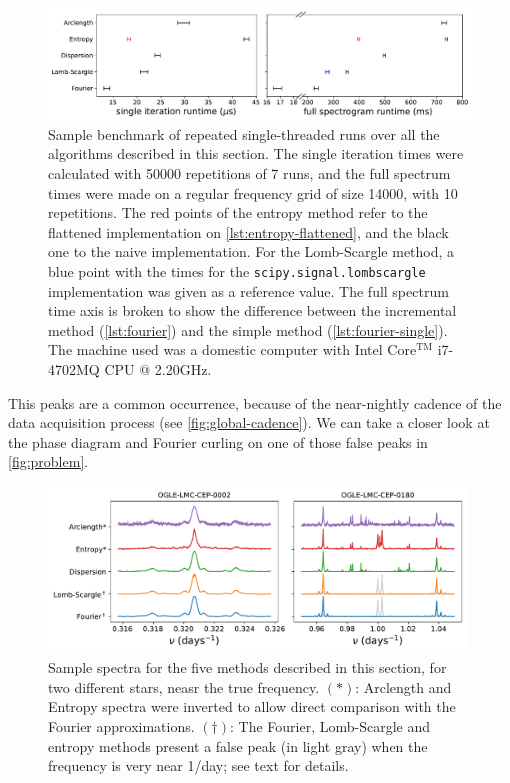 \begin{figure}
	\centering
	\includegraphics[width=\textwidth]{img/runtimes.pdf}
	\caption[Illustrative benchmark for the algorithms]{
		Sample benchmark of repeated single-threaded runs over all the algorithms described in this section.
		The single iteration times were calculated with 50000 repetitions of 7 runs, 
		and the full spectrum times were made on a regular frequency grid of size 14000, with 10 repetitions.
		The red points of the entropy method refer to the flattened implementation on \autoref{lst:entropy-flattened},
		and the black one to the naive implementation.
		For the Lomb-Scargle method, a blue point with the times for the \texttt{scipy.signal.lombscargle} implementation was given as a reference value.
		The full spectrum time axis is broken to show the difference between the incremental method (\autoref{lst:fourier}) and the simple method (\autoref{lst:fourier-single}).
		The machine used was a domestic computer with Intel \textregistered{} Core$^{\text{TM}}$ i7-4702MQ CPU @ 2.20GHz.
	}
	\label{fig:runtimes}
\end{figure}

This peaks are a common occurrence, because of the near-nightly cadence of the data acquisition process (see \autoref{fig:global-cadence}).
We can take a closer look at the phase diagram and Fourier curling on one of those false peaks in \autoref{fig:problem}.

\begin{figure}
	\centering
	\includegraphics[width=0.99\textwidth]{img/examples.pdf}
	\caption[Example of spectra near the true frequency]{
		Sample spectra for the five methods described in this section, for two different stars, neasr the true frequency.
		$(\ast)$: Arclength and Entropy spectra were inverted to allow direct comparison with the Fourier approximations.
		$(\dagger)$: The Fourier, Lomb-Scargle and entropy methods present a false peak (in light gray) 
		when the frequency is very near 1/day; see text for details.
	}
	\label{fig:examples}
\end{figure}

